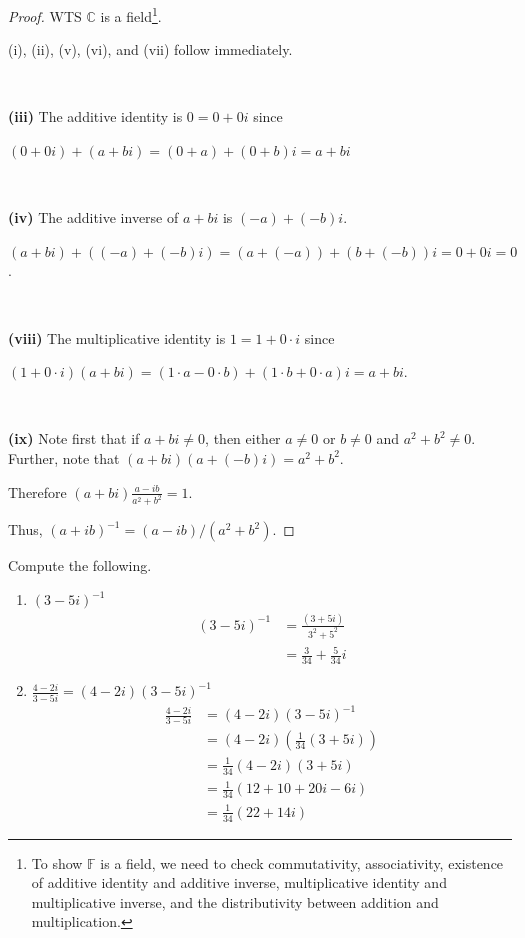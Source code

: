 \documentclass[11pt,fleqn]{book} %
\begin{document}
\begin{proof}
    WTS $\mathbb{C}$ is a field\footnote{To show $\mathbb{F}$ is a field, we need to check commutativity, associativity, existence of additive identity and additive inverse, multiplicative identity and multiplicative inverse, and the distributivity between addition and multiplication. }.

    (i), (ii), (v), (vi), and (vii) follow immediately.

    {~~~}

    \textbf{(iii)} The additive identity is $0 = 0 + 0i$ since

    $(0 + 0i) + (a + bi) = (0 + a) + (0 + b)i = a + bi$

    {~~~}

    \textbf{(iv)} The additive inverse of $a + bi$ is $(-a) + (-b)i$.

    $(a + bi) + ((-a) + (-b)i) = (a + (-a)) + (b + (-b))i = 0 + 0i = 0$.

    {~~~}

    \textbf{(viii)} The multiplicative identity is $1 = 1 + 0 \cdot i$ since

    $(1 + 0 \cdot i)(a + bi) = (1 \cdot a - 0 \cdot b) + (1 \cdot b + 0 \cdot a)i = a + bi$.

    {~~~}

    \textbf{(ix)} Note first that if $a + bi \neq 0$, then either $a \neq 0$ or $b \neq 0$ and $a^2 + b^2 \neq 0$. Further, note that $(a + bi)(a + (-b)i) = a^2 + b^2$.

    Therefore $\displaystyle (a + bi) \frac{a - ib}{a^2 + b^2} = 1$.

    Thus, $(a + ib)^{-1} = (a - ib) / (a^2 + b^2)$.
\end{proof}

\begin{exercise}
    Compute the following.
    \begin{enumerate}
        \item $(3-5i)^{-1}$
        {\color{lightblue} \begin{align*}
            (3-5i)^{-1}
            &=\frac{(3+5i)}{3^2+5^2}
            \\
            &=\frac{3}{34}+\frac{5}{34}i
        \end{align*} }

        \item $\displaystyle \frac{4-2i}{3-5i} = (4-2i)(3-5i)^{-1}$
        {\color{lightblue} \begin{align*}
            \frac{4-2i}{3-5i}
            &= (4-2i)(3-5i)^{-1}
            \\
            &=(4-2i) \left( \frac{1}{34}(3+5i) \right)
            \\
            &=\frac{1}{34}(4-2i)(3+5i)
            \\
            &=\frac{1}{34}(12+10+20i-6i)
            \\
            &=\frac{1}{34}(22+14i)
        \end{align*} }
    \end{enumerate}
\end{exercise}
\end{document}
